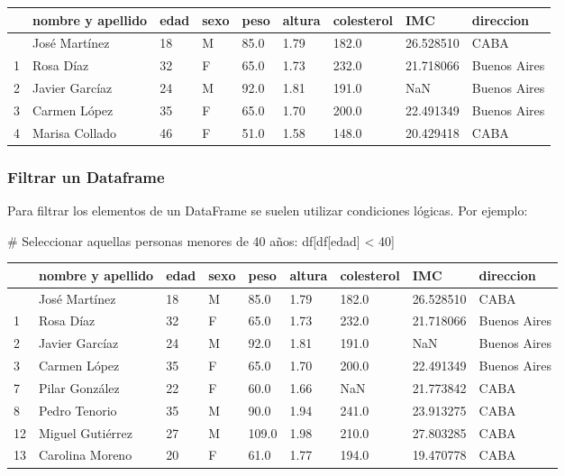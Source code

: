 \documentclass[
  letterpaper,
  DIV=11,
  numbers=noendperiod]{scrreprt}
\newenvironment{Shaded}{\begin{snugshade}}{\end{snugshade}}
\newcommand{\CommentTok}[1]{\textcolor[rgb]{0.37,0.37,0.37}{#1}}
\newcommand{\DecValTok}[1]{\textcolor[rgb]{0.68,0.00,0.00}{#1}}
\newcommand{\NormalTok}[1]{\textcolor[rgb]{0.00,0.23,0.31}{#1}}
\newcommand{\OperatorTok}[1]{\textcolor[rgb]{0.37,0.37,0.37}{#1}}
\newcommand{\StringTok}[1]{\textcolor[rgb]{0.13,0.47,0.30}{#1}}
\begin{document}
\begin{longtable}[]{@{}lllllllll@{}}
\toprule\noalign{}
& nombre y apellido & edad & sexo & peso & altura & colesterol & IMC &
direccion \\
\midrule\noalign{}
\endhead
\bottomrule\noalign{}
\endlastfoot
0 & José Martínez & 18 & M & 85.0 & 1.79 & 182.0 & 26.528510 & CABA \\
1 & Rosa Díaz & 32 & F & 65.0 & 1.73 & 232.0 & 21.718066 & Buenos
Aires \\
2 & Javier Garcíaz & 24 & M & 92.0 & 1.81 & 191.0 & NaN & Buenos
Aires \\
3 & Carmen López & 35 & F & 65.0 & 1.70 & 200.0 & 22.491349 & Buenos
Aires \\
4 & Marisa Collado & 46 & F & 51.0 & 1.58 & 148.0 & 20.429418 & CABA \\
\end{longtable}

\subsubsection{Filtrar un Dataframe}\label{filtrar-un-dataframe}

Para filtrar los elementos de un DataFrame se suelen utilizar
condiciones lógicas. Por ejemplo:

\begin{Shaded}
\begin{Highlighting}[]
\CommentTok{\# Seleccionar aquellas personas menores de 40 años:}
\NormalTok{df[df[}\StringTok{\textquotesingle{}edad\textquotesingle{}}\NormalTok{] }\OperatorTok{\textless{}} \DecValTok{40}\NormalTok{]}
\end{Highlighting}
\end{Shaded}

\begin{longtable}[]{@{}lllllllll@{}}
\toprule\noalign{}
& nombre y apellido & edad & sexo & peso & altura & colesterol & IMC &
direccion \\
\midrule\noalign{}
\endhead
\bottomrule\noalign{}
\endlastfoot
0 & José Martínez & 18 & M & 85.0 & 1.79 & 182.0 & 26.528510 & CABA \\
1 & Rosa Díaz & 32 & F & 65.0 & 1.73 & 232.0 & 21.718066 & Buenos
Aires \\
2 & Javier Garcíaz & 24 & M & 92.0 & 1.81 & 191.0 & NaN & Buenos
Aires \\
3 & Carmen López & 35 & F & 65.0 & 1.70 & 200.0 & 22.491349 & Buenos
Aires \\
7 & Pilar González & 22 & F & 60.0 & 1.66 & NaN & 21.773842 & CABA \\
8 & Pedro Tenorio & 35 & M & 90.0 & 1.94 & 241.0 & 23.913275 & CABA \\
12 & Miguel Gutiérrez & 27 & M & 109.0 & 1.98 & 210.0 & 27.803285 &
CABA \\
13 & Carolina Moreno & 20 & F & 61.0 & 1.77 & 194.0 & 19.470778 &
CABA \\
\end{longtable}
\end{document}
